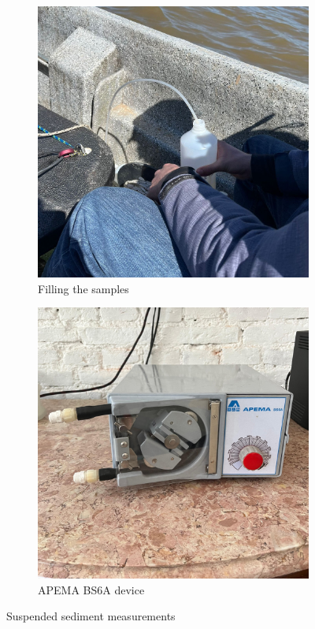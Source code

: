 \begin{figure}[H]
    \centering
    \begin{subfigure}[t]{0.48\textwidth}
        \centering
        \includegraphics[width=\linewidth]{figures/ch4/fles.jpg}
        \caption{Filling the samples}
    \end{subfigure}
    \hfill
    \begin{subfigure}[t]{0.48\textwidth}
        \centering
        \includegraphics[width=\linewidth]{figures/ch4/APEMA BS6A.jpg}
        \caption{APEMA BS6A device}
    \end{subfigure}
    \caption{Suspended sediment measurements}
    \label{fig:suspended-sediment}
\end{figure}

